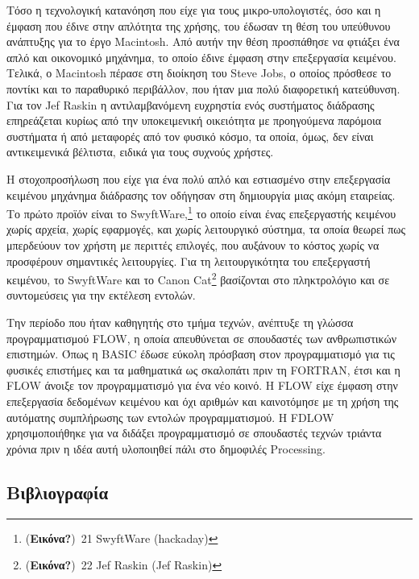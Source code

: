 \documentclass[
]{article}
\begin{document}
Τόσο η τεχνολογική κατανόηση που είχε για τους μικρο-υπολογιστές, όσο
και η έμφαση που έδινε στην απλότητα της χρήσης, του έδωσαν τη θέση του
υπεύθυνου ανάπτυξης για το έργο Macintosh. Από αυτήν την θέση προσπάθησε
να φτιάξει ένα απλό και οικονομικό μηχάνημα, το οποίο έδινε έμφαση στην
επεξεργασία κειμένου. Τελικά, ο Macintosh πέρασε στη διοίκηση του Steve
Jobs, ο οποίος πρόσθεσε το ποντίκι και το παραθυρικό περιβάλλον, που
ήταν μια πολύ διαφορετική κατεύθυνση. Για τον Jef Raskin η
αντιλαμβανόμενη ευχρηστία ενός συστήματος διάδρασης επηρεάζεται κυρίως
από την υποκειμενική οικειότητα με προηγούμενα παρόμοια συστήματα ή από
μεταφορές από τον φυσικό κόσμο, τα οποία, όμως, δεν είναι αντικειμενικά
βέλτιστα, ειδικά για τους συχνούς χρήστες.

Η στοχοπροσήλωση που είχε για ένα πολύ απλό και εστιασμένο στην
επεξεργασία κειμένου μηχάνημα διάδρασης τον οδήγησαν στη δημιουργία μιας
ακόμη εταιρείας. Το πρώτο προϊόν είναι το SwyftWare,\footnote{(\textbf{Εικόνα?})~21
  SwyftWare (hackaday)} το οποίο είναι ένας επεξεργαστής κειμένου χωρίς
αρχεία, χωρίς εφαρμογές, και χωρίς λειτουργικό σύστημα, τα οποία θεωρεί
πως μπερδεύουν τον χρήστη με περιττές επιλογές, που αυξάνουν το κόστος
χωρίς να προσφέρουν σημαντικές λειτουργίες. Για τη λειτουργικότητα του
επεξεργαστή κειμένου, το SwyftWare και το Canon Cat\footnote{(\textbf{Εικόνα?})~22
  Jef Raskin (Jef Raskin)} βασίζονται στο πληκτρολόγιο και σε
συντομεύσεις για την εκτέλεση εντολών.

Την περίοδο που ήταν καθηγητής στο τμήμα τεχνών, ανέπτυξε τη γλώσσα
προγραμματισμού FLOW, η οποία απευθύνεται σε σπουδαστές των
ανθρωπιστικών επιστημών. Όπως η BASIC έδωσε εύκολη πρόσβαση στον
προγραμματισμό για τις φυσικές επιστήμες και τα μαθηματικά ως σκαλοπάτι
πριν τη FORTRAN, έτσι και η FLOW άνοιξε τον προγραμματισμό για ένα νέο
κοινό. Η FLOW είχε έμφαση στην επεξεργασία δεδομένων κειμένου και όχι
αριθμών και καινοτόμησε με τη χρήση της αυτόματης συμπλήρωσης των
εντολών προγραμματισμού. Η FDLOW χρησιμοποιήθηκε για να διδάξει
προγραμματισμό σε σπουδαστές τεχνών τριάντα χρόνια πριν η ιδέα αυτή
υλοποιηθεί πάλι στο δημοφιλές Processing.

\hypertarget{ux3b2ux3b9ux3b2ux3bbux3b9ux3bfux3b3ux3c1ux3b1ux3c6ux3afux3b1}{%
\subsection*{Βιβλιογραφία}\label{ux3b2ux3b9ux3b2ux3bbux3b9ux3bfux3b3ux3c1ux3b1ux3c6ux3afux3b1}}
\end{document}
